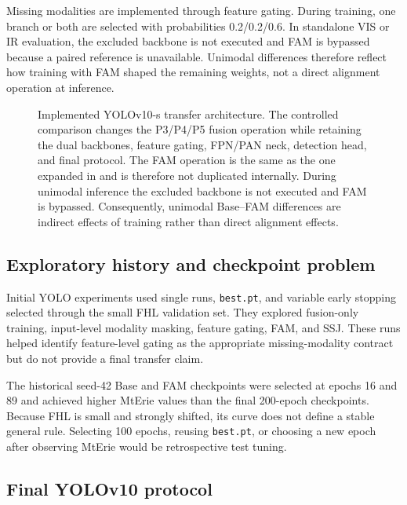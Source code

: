 Missing modalities are implemented through feature gating. During training,
one branch or both are selected with probabilities 0.2/0.2/0.6. In standalone
VIS or IR evaluation, the excluded backbone is not executed and FAM is
bypassed because a paired reference is unavailable. Unimodal differences
therefore reflect how training with FAM shaped the remaining weights, not a
direct alignment operation at inference.

\begin{figure}[H]
  \centering
  \caption{Implemented YOLOv10-s transfer architecture. The controlled
  comparison changes the P3/P4/P5 fusion operation while retaining the dual
  backbones, feature gating, FPN/PAN neck, detection head, and final protocol.
  The FAM operation is the same as the one expanded in
   and is therefore not duplicated internally.
  During unimodal inference the excluded backbone is not executed and FAM is
  bypassed. Consequently, unimodal Base--FAM differences are indirect
  effects of training rather than direct alignment effects.}
  \label{fig:yolo-architecture}
\end{figure}

\subsection{Exploratory history and checkpoint problem}

Initial YOLO experiments used single runs, \texttt{best.pt}, and variable early
stopping selected through the small FHL validation set. They explored
fusion-only training, input-level modality masking, feature gating, FAM, and
SSJ. These runs helped identify feature-level gating as the appropriate
missing-modality contract but do not provide a final transfer claim.

The historical seed-42 Base and FAM checkpoints were selected at epochs 16
and 89 and achieved higher MtErie values than the final 200-epoch checkpoints.
Because FHL is small and strongly shifted, its curve does not define a stable
general rule. Selecting 100 epochs, reusing \texttt{best.pt}, or choosing a new
epoch after observing MtErie would be retrospective test tuning.

\subsection{Final YOLOv10 protocol}

